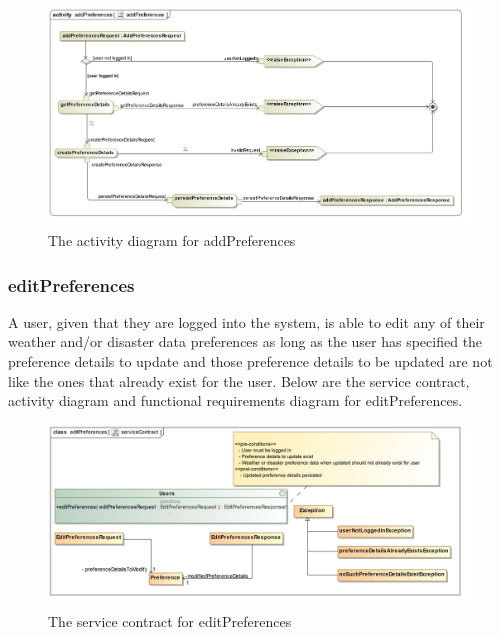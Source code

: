 \begin{figure}[H]
	\centering
	\includegraphics[width=1.0\textwidth]{../images/funcReq/addPreferencesActivityDiagram.jpg}
	\caption{The activity diagram for addPreferences \label{overflow}}
\end{figure}

\subsubsection{editPreferences}

A user, given that they are logged into the system, is able to edit any of their weather and/or disaster data preferences as long as the user has specified the preference details to update and those preference details to be updated are not like the ones that already exist for the user. Below are the service contract, activity diagram and functional requirements diagram for editPreferences.

\begin{figure}[H]
	\centering
	\includegraphics[width=1.0\textwidth]{../images/funcReq/editPreferencesServiceContract.jpg}
	\caption{The service contract for editPreferences \label{overflow}}
\end{figure}

